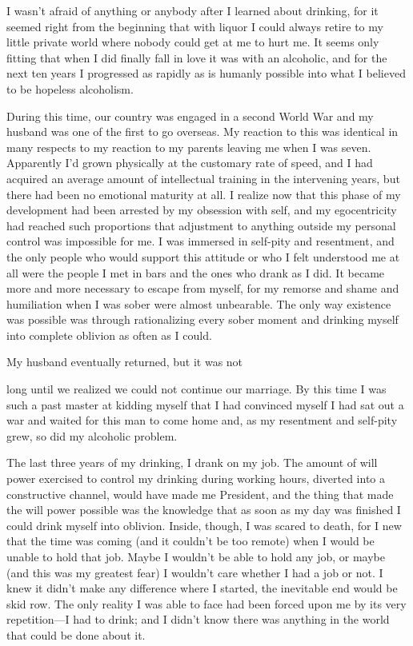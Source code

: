 \begin{biblechapter}
I wasn’t afraid of anything or anybody after I learned about drinking, for it seemed right from the beginning that with liquor I could always retire to my little private world where nobody could get at me to hurt me. It seems only fitting that when I did finally fall in love it was with an alcoholic, and for the next ten years I progressed as rapidly as is humanly possible into what I believed to be hopeless alcoholism.

During this time, our country was engaged in a second World War and my husband was one of the first to go overseas. My reaction to this was identical in many respects to my reaction to my parents leaving me when I was seven. Apparently I’d grown physically at the customary rate of speed, and I had acquired an average amount of intellectual training in the intervening years, but there had been no emotional maturity at all. I realize now that this phase of my development had been arrested by my obsession with self, and my egocentricity had reached such proportions that adjustment to anything outside my personal control was impossible for me. I was immersed in self-pity and resentment, and the only people who would support this attitude or who I felt understood me at all were the people I met in bars and the ones who drank as I did. It became more and more necessary to escape from myself, for my remorse and shame and humiliation when I was sober were almost unbearable. The only way existence was possible was through rationalizing every sober moment and drinking myself into complete oblivion as often as I could.

My husband eventually returned, but it was not

long until we realized we could not continue our marriage. By this time I was such a past master at kidding myself that I had convinced myself I had sat out a war and waited for this man to come home and, as my resentment and self-pity grew, so did my alcoholic problem.

The last three years of my drinking, I drank on my job. The amount of will power exercised to control my drinking during working hours, diverted into a constructive channel, would have made me President, and the thing that made the will power possible was the knowledge that as soon as my day was finished I could drink myself into oblivion. Inside, though, I was scared to death, for I new that the time was coming (and it couldn’t be too remote) when I would be unable to hold that job. Maybe I wouldn’t be able to hold any job, or maybe (and this was my greatest fear) I wouldn’t care whether I had a job or not. I knew it didn’t make any difference where I started, the inevitable end would be skid row. The only reality I was able to face had been forced upon me by its very repetition—I had to drink; and I didn’t know there was anything in the world that could be done about it.


\end{biblechapter}
